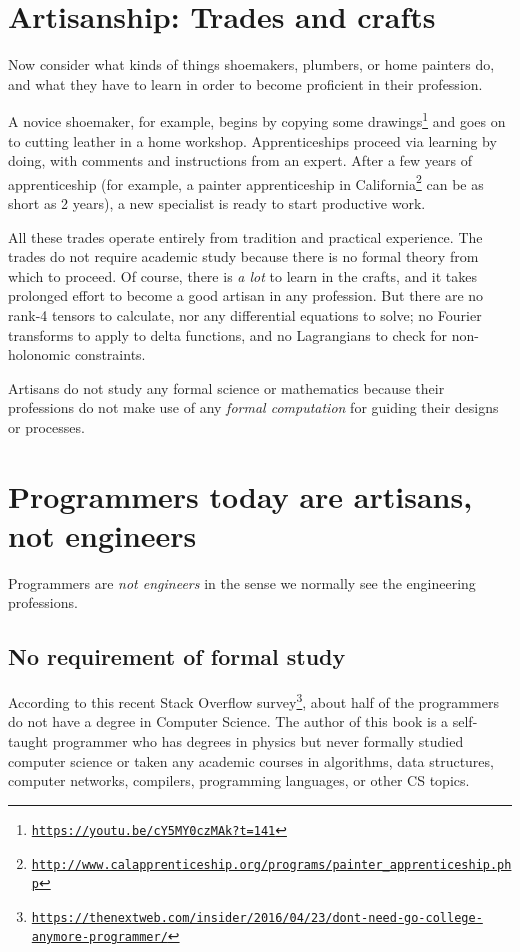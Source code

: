 \section{Artisanship: Trades and crafts }

Now consider what kinds of things shoemakers, plumbers, or home painters
do, and what they have to learn in order to become proficient in their
profession.

A novice shoemaker, for example, begins by copying some drawings\footnote{\texttt{\href{https://youtu.be/cY5MY0czMAk?t=141}{https://youtu.be/cY5MY0czMAk?t=141}}}
and goes on to cutting leather in a home workshop. Apprenticeships
proceed via learning by doing, with comments and instructions from
an expert. After a few years of apprenticeship (for example, a painter
apprenticeship in California\footnote{\texttt{\href{http://www.calapprenticeship.org/programs/painter_apprenticeship.php}{http://www.calapprenticeship.org/programs/painter\_apprenticeship.php}}}
can be as short as 2 years), a new specialist is ready to start productive
work. 

All these trades operate entirely from tradition and practical experience.
The trades do not require academic study because there is no formal
theory from which to proceed. Of course, there is \emph{a lot} to
learn in the crafts, and it takes prolonged effort to become a good
artisan in any profession. But there are no rank-4 tensors to calculate,
nor any differential equations to solve; no Fourier transforms to
apply to delta functions, and no Lagrangians to check for non-holonomic
constraints.

Artisans do not study any formal science or mathematics because their
professions do not make use of any \emph{formal computation} for guiding
their designs or processes.

\section{Programmers today are artisans, not engineers }

Programmers are \emph{not engineers} in the sense we normally see
the engineering professions.

\subsection{No requirement of formal study }

According to this recent Stack Overflow survey\footnote{\texttt{\href{https://thenextweb.com/insider/2016/04/23/dont-need-go-college-anymore-programmer/}{https://thenextweb.com/insider/2016/04/23/dont-need-go-college-anymore-programmer/}}},
about half of the programmers do not have a degree in Computer Science.
The author of this book is a self-taught programmer who has degrees
in physics but never formally studied computer science or taken any
academic courses in algorithms, data structures, computer networks,
compilers, programming languages, or other CS topics. 

